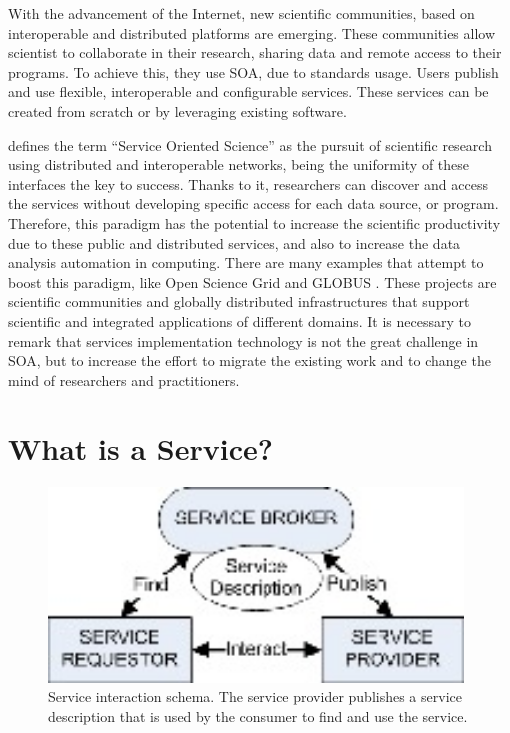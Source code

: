With the advancement of the Internet, new scientific communities, based on interoperable and distributed platforms are emerging. These communities allow scientist to collaborate in their research, sharing data and remote access to their programs. To achieve this, they use SOA, due to standards usage. Users publish and use flexible, interoperable and configurable services. These services can be created from scratch or by leveraging existing software. 

 \cite{Foster2005Science} defines the term ``Service Oriented
Science'' as the pursuit of scientific research using distributed and
interoperable networks, being the uniformity of
these interfaces the key to success. Thanks to it, researchers can discover and access
the services without developing specific access for each data source, or
program. Therefore, this paradigm has the potential to increase the
scientific productivity due to these public and distributed services, and also to increase the data analysis automation in computing. There are many examples that attempt to boost this paradigm, like Open Science Grid \citep{Altunay2011OpenScience} and GLOBUS \citep{Foster2005Globus}. These projects are scientific communities and globally distributed infrastructures that support scientific and integrated applications of different domains.
It is necessary to remark that services implementation technology is not the
great challenge in SOA, but to increase the effort to migrate the
existing work and to change the mind of researchers and
practitioners. 

\section{What is a Service?}



\begin{figure}
\centering
\includegraphics[width=26pc]{gfx/soa/soaDiagram.jpg}
\caption{Service interaction schema. The service provider publishes a service description that is used by the consumer to find and use the service.}
\label{fig:soadiagram}
\end{figure}




